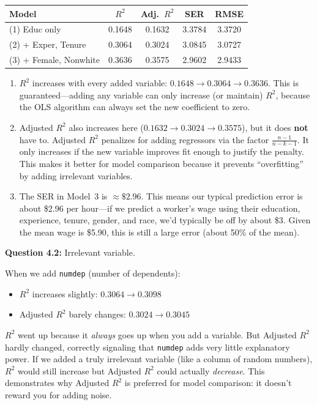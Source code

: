 \documentclass[11pt,letterpaper]{article}
\begin{document}
\begin{answer}
\begin{center}
\begin{tabular}{l|cccc}
\toprule
Model & $R^2$ & Adj.\ $R^2$ & SER & RMSE \\
\midrule
(1) Educ only & 0.1648 & 0.1632 & 3.3784 & 3.3720 \\
(2) + Exper, Tenure & 0.3064 & 0.3024 & 3.0845 & 3.0727 \\
(3) + Female, Nonwhite & 0.3636 & 0.3575 & 2.9602 & 2.9433 \\
\bottomrule
\end{tabular}
\end{center}

\begin{enumerate}[label=(\alph*)]
\item $R^2$ increases with every added variable: $0.1648 \to 0.3064 \to 0.3636$. This is guaranteed---adding any variable can only increase (or maintain) $R^2$, because the OLS algorithm can always set the new coefficient to zero.

\item Adjusted $R^2$ also increases here ($0.1632 \to 0.3024 \to 0.3575$), but it does \textbf{not} have to. Adjusted $R^2$ penalizes for adding regressors via the factor $\frac{n-1}{n-k-1}$. It only increases if the new variable improves fit enough to justify the penalty. This makes it better for model comparison because it prevents ``overfitting'' by adding irrelevant variables.

\item The SER in Model~3 is $\approx \$2.96$. This means our typical prediction error is about \$2.96 per hour---if we predict a worker's wage using their education, experience, tenure, gender, and race, we'd typically be off by about \$3. Given the mean wage is \$5.90, this is still a large error (about 50\% of the mean).
\end{enumerate}
\end{answer}

\textbf{Question 4.2:} Irrelevant variable.

\begin{answer}
When we add \texttt{numdep} (number of dependents):
\begin{itemize}[noitemsep]
\item $R^2$ increases slightly: $0.3064 \to 0.3098$
\item Adjusted $R^2$ barely changes: $0.3024 \to 0.3045$
\end{itemize}

$R^2$ went up because it \textit{always} goes up when you add a variable. But Adjusted $R^2$ hardly changed, correctly signaling that \texttt{numdep} adds very little explanatory power. If we added a truly irrelevant variable (like a column of random numbers), $R^2$ would still increase but Adjusted $R^2$ could actually \textit{decrease}. This demonstrates why Adjusted $R^2$ is preferred for model comparison: it doesn't reward you for adding noise.
\end{answer}
\end{document}
